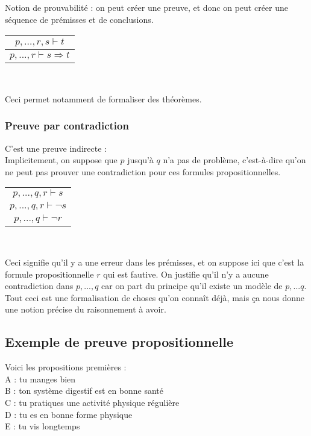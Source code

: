 			Notion de prouvabilité : on peut créer une preuve, et donc on peut créer une séquence de prémisses et de conclusions.
			\begin{center}
			\begin{tabular}{c}
      		$p,...,r,s \vdash t$ \\
      		\hline
      		$p,...,r \vdash s\Rightarrow t$\\
   			\end{tabular}\\
			\end{center}
			Ceci permet notamment de formaliser des théorèmes.
			
		\subsubsection*{Preuve par contradiction}
		C'est une preuve indirecte :\\
		Implicitement, on suppose que $p$ jusqu'à $q$ n'a pas de problème, c'est-à-dire qu'on ne peut pas prouver une contradiction pour ces formules propositionnelles.
		\begin{center}
			\begin{tabular}{c}
      		$p,...,q,r \vdash s$ \\
      		$p,...,q,r \vdash \lnot s$\\
      		\hline
      		$p,...,q \vdash \lnot r$\\
   			\end{tabular}\\
			\end{center}
			
			Ceci signifie qu'il y a une erreur dans les prémisses, et on suppose ici que c'est la formule propositionnelle $r$ qui est fautive. On justifie qu'il n'y a aucune contradiction dans $p,...,q$ car on part du principe qu'il existe un modèle de $p,...q$.\\
			
			Tout ceci est une formalisation de choses qu'on connaît déjà, mais ça nous donne une notion précise du raisonnement à avoir.
			
\subsection{Exemple de preuve propositionnelle}

\noindent Voici les propositions premières : \\
A : tu manges bien \\
B : ton système digestif est en bonne santé \\
C : tu pratiques une activité physique régulière \\
D : tu es en bonne forme physique \\
E : tu vis longtemps \\


